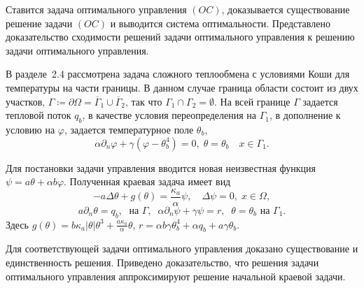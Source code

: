 Ставится задача оптимального управления $(OC)$, доказывается существование решение задачи $(OC)$
и выводится система оптимальности.
Представлено доказательство сходимости решений задачи оптимального
управления к решению задачи оптимального управления.


В разделе~2.4 рассмотрена задача сложного теплообмена с условиями Коши для
температуры на части границы.
В данном случае граница области состоит из двух участков,
$\Gamma \coloneqq \partial \Omega =\overline{\Gamma}_1 \cup \overline{\Gamma}_2$,
так что $\Gamma_1 \cap \Gamma_2 =  \emptyset$.
На всей границе $\Gamma$ задается тепловой поток $q_b$,
в качестве условия
переопределения на $\Gamma_1$, в дополнение к условию на
$\varphi$, задается температурное поле $\theta_b$,
\begin{equation}
    \label{eq:2_4:bc2}
    \alpha\partial_n\varphi + \gamma (\varphi - \theta_b ^4 ) = 0,\;
    \theta=\theta_b\quad x\in \Gamma_1.
\end{equation}


Для постановки задачи управления вводится новая неизвестная функция
$\psi= a\theta + \alpha b \varphi$.
Полученная краевая задача имеет вид
\begin{equation}
    \label{eq:2_4:eq2}
    - a \Delta \theta + g (\theta) = \frac{\kappa_a}{\alpha}\psi, \quad
    \Delta \psi = 0, \; x \in \Omega,
\end{equation}
\begin{equation}
    \label{eq:2_4:bc3}
    a \partial_n \theta = q_b, \; \text{ на }\Gamma, \;\;
    \alpha \partial_n \psi + \gamma \psi  =  r,\;\;
    \theta = \theta_b  \text{ на }\Gamma_1.
\end{equation}
Здесь $g(\theta) = b \kappa_a|\theta|\theta^3 + \frac{a\kappa_a}{\alpha}\theta$, $r=\alpha b \gamma \theta_b^4+ \alpha q_b + a \gamma \theta_b$.


Для соответствующей задачи оптимального управления
доказано существование и единственность решения.
Приведено доказательство, что решения задачи оптимального управления
аппроксимируют решение начальной краевой задачи.


